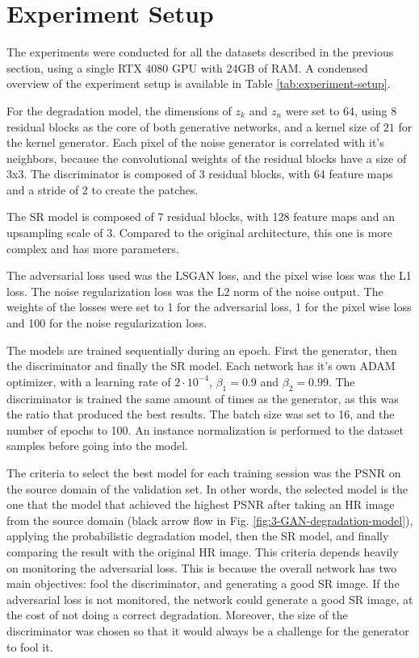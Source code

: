 \section{Experiment Setup}

The experiments were conducted for all the datasets described in the previous section, using a single RTX 4080 GPU with 24GB of RAM.   A condensed overview of the experiment setup is available in Table \ref{tab:experiment-setup}.

For the degradation model, the dimensions of $z_k$ and $z_n$ were set to $64$, using 8 residual blocks as the core of both generative networks, and a kernel size of $21$ for the kernel generator. Each pixel of the noise generator is correlated with it's neighbors, because the convolutional weights of the residual blocks have a size of 3x3. The discriminator is composed of 3 residual blocks, with 64 feature maps and a stride of 2 to create the patches.

The SR model is composed of 7 residual blocks, with 128 feature maps and an upsampling scale of 3. Compared to the original architecture, this one is more complex and has more parameters.

The adversarial loss used was the LSGAN loss, and the pixel wise loss was the L1 loss. The noise regularization loss was the L2 norm of the noise output. The weights of the losses were set to 1 for the adversarial loss, 1 for the pixel wise loss and 100 for the noise regularization loss.

The models are trained sequentially during an epoch. First the generator, then the discriminator and finally the SR model. Each network has it's own ADAM optimizer, with a learning rate of $2 \cdot 10^{-4}$,
 $\beta_1 = 0.9$ and $\beta_2 = 0.99$. The discriminator is trained the same amount of times as the generator, as this was the ratio that produced the best results. The batch size was set to 16, and the number of epochs to 100. An instance normalization is performed to the dataset samples before going into the model.

The criteria to select the best model for each training session was the PSNR on the source domain of the validation set. 
In other words, the selected model is the one that the model that achieved the highest PSNR after taking an HR image from the source domain (black arrow flow in Fig. \ref{fig:3-GAN-degradation-model}), applying the probabilistic degradation model, then the SR model, and finally comparing the result with the original HR image.
This criteria depends heavily on monitoring the adversarial loss. This is because the overall network has two main objectives: fool the discriminator, and generating a good SR image. If the adversarial loss is not monitored, the network could generate a good SR image, at the cost of not doing a correct degradation. Moreover, the size of the discriminator was chosen so that it would always be a challenge for the generator to fool it.

